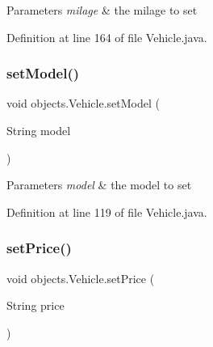 \begin{DoxyParams}{Parameters}
{\em milage} & the milage to set \\
\hline
\end{DoxyParams}


Definition at line 164 of file Vehicle.\+java.


\begin{DoxyCode}{0}

\end{DoxyCode}
\mbox{\label{classobjects_1_1_vehicle_a32a4aaf36a749654ef62934121f854b4}} 
\subsubsection{\texorpdfstring{setModel()}{setModel()}}
{\footnotesize\ttfamily void objects.\+Vehicle.\+set\+Model (\begin{DoxyParamCaption}\item[{String}]{model }\end{DoxyParamCaption})}


\begin{DoxyParams}{Parameters}
{\em model} & the model to set \\
\hline
\end{DoxyParams}


Definition at line 119 of file Vehicle.\+java.


\begin{DoxyCode}{0}

\end{DoxyCode}
\mbox{\label{classobjects_1_1_vehicle_addc55186979236313365711248dfbd3a}} 
\subsubsection{\texorpdfstring{setPrice()}{setPrice()}}
{\footnotesize\ttfamily void objects.\+Vehicle.\+set\+Price (\begin{DoxyParamCaption}\item[{String}]{price }\end{DoxyParamCaption})}


